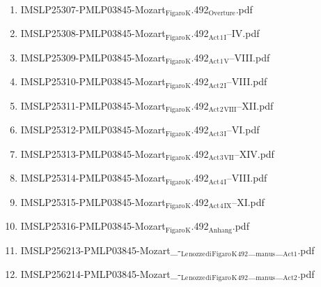 \documentclass[11pt]{article}
\begin{document}
\begin{enumerate}
\begin{enumerate}
\begin{enumerate}
\item IMSLP25307-PMLP03845-Mozart$_{\text{Figaro}}$$_{\text{K}}$.492$_{\text{Overture}}$.pdf
\label{sec-1-1-1-1-44-49-3-9-2}

\item IMSLP25308-PMLP03845-Mozart$_{\text{Figaro}}$$_{\text{K}}$.492$_{\text{Act}}$$_{\text{1}}$$_{\text{I}}$--IV.pdf
\label{sec-1-1-1-1-44-49-3-9-3}

\item IMSLP25309-PMLP03845-Mozart$_{\text{Figaro}}$$_{\text{K}}$.492$_{\text{Act}}$$_{\text{1}}$$_{\text{V}}$--VIII.pdf
\label{sec-1-1-1-1-44-49-3-9-4}

\item IMSLP25310-PMLP03845-Mozart$_{\text{Figaro}}$$_{\text{K}}$.492$_{\text{Act}}$$_{\text{2}}$$_{\text{I}}$--VIII.pdf
\label{sec-1-1-1-1-44-49-3-9-5}

\item IMSLP25311-PMLP03845-Mozart$_{\text{Figaro}}$$_{\text{K}}$.492$_{\text{Act}}$$_{\text{2}}$$_{\text{VIII}}$--XII.pdf
\label{sec-1-1-1-1-44-49-3-9-6}

\item IMSLP25312-PMLP03845-Mozart$_{\text{Figaro}}$$_{\text{K}}$.492$_{\text{Act}}$$_{\text{3}}$$_{\text{I}}$--VI.pdf
\label{sec-1-1-1-1-44-49-3-9-7}

\item IMSLP25313-PMLP03845-Mozart$_{\text{Figaro}}$$_{\text{K}}$.492$_{\text{Act}}$$_{\text{3}}$$_{\text{VII}}$--XIV.pdf
\label{sec-1-1-1-1-44-49-3-9-8}

\item IMSLP25314-PMLP03845-Mozart$_{\text{Figaro}}$$_{\text{K}}$.492$_{\text{Act}}$$_{\text{4}}$$_{\text{I}}$--VIII.pdf
\label{sec-1-1-1-1-44-49-3-9-9}

\item IMSLP25315-PMLP03845-Mozart$_{\text{Figaro}}$$_{\text{K}}$.492$_{\text{Act}}$$_{\text{4}}$$_{\text{IX}}$--XI.pdf
\label{sec-1-1-1-1-44-49-3-9-10}

\item IMSLP25316-PMLP03845-Mozart$_{\text{Figaro}}$$_{\text{K}}$.492$_{\text{Anhang}}$.pdf
\label{sec-1-1-1-1-44-49-3-9-11}

\item IMSLP256213-PMLP03845-Mozart\_-$_{\text{Le}}$$_{\text{nozze}}$$_{\text{di}}$$_{\text{Figaro}}$$_{\text{K}}$$_{\text{492}}$\_$_{\text{manus}}$\_$_{\text{Act1}}$.pdf
\label{sec-1-1-1-1-44-49-3-9-12}

\item IMSLP256214-PMLP03845-Mozart\_-$_{\text{Le}}$$_{\text{nozze}}$$_{\text{di}}$$_{\text{Figaro}}$$_{\text{K}}$$_{\text{492}}$\_$_{\text{manus}}$\_$_{\text{Act2}}$.pdf
\label{sec-1-1-1-1-44-49-3-9-13}


\end{enumerate}
\end{enumerate}
\end{enumerate}
\end{document}
